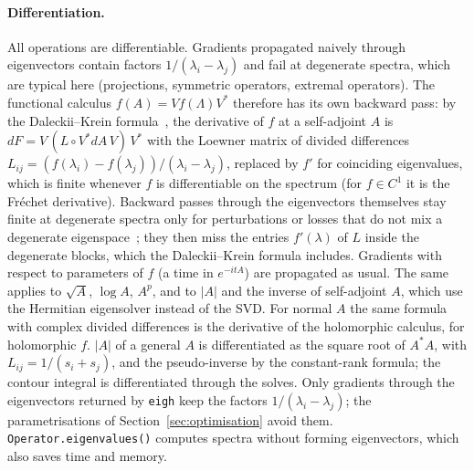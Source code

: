 \documentclass[11pt]{article}
\begin{document}
\paragraph{Differentiation.} All operations are differentiable. Gradients propagated naively through
eigenvectors contain factors $1/(\lambda_i-\lambda_j)$ and fail at degenerate spectra, which are typical here
(projections, symmetric operators, extremal operators). The functional calculus $f(A)=Vf(\Lambda)V^*$ therefore
has its own backward pass: by the Daleckii--Krein formula~\cite{daleckii1965,bhatia1997}, the derivative of $f$ at
a self-adjoint $A$ is $dF=V\,(L\circ V^*dA\,V)\,V^*$ with the Loewner matrix of divided differences
$L_{ij}=(f(\lambda_i)-f(\lambda_j))/(\lambda_i-\lambda_j)$, replaced by $f'$ for coinciding eigenvalues, which is
finite whenever $f$ is differentiable on the spectrum (for $f\in C^1$ it is the Fr\'echet derivative). Backward
passes through the eigenvectors themselves stay finite at degenerate spectra only for perturbations or losses that
do not mix a degenerate eigenspace~\cite{kasim2020}; they then miss the entries $f'(\lambda)$ of $L$ inside the
degenerate blocks, which the Daleckii--Krein formula includes. Gradients with respect to
parameters of $f$ (a time in $e^{-itA}$) are propagated as usual. The same applies to $\sqrt A$, $\log A$, $A^p$,
and to $|A|$ and the inverse of self-adjoint $A$, which use the Hermitian eigensolver instead of the SVD. For normal $A$ the same formula with complex divided differences is the derivative of the
holomorphic calculus, for holomorphic $f$. $|A|$ of a general $A$ is differentiated as the square root of $A^*A$,
with $L_{ij}=1/(s_i+s_j)$, and the pseudo-inverse by the constant-rank formula; the contour integral is
differentiated through the solves. Only gradients through the eigenvectors returned by \texttt{eigh} keep the
factors $1/(\lambda_i-\lambda_j)$; the parametrisations of Section~\ref{sec:optimisation} avoid them. \texttt{Operator.eigenvalues()} computes spectra without forming eigenvectors, which also saves time and
memory.
\end{document}
